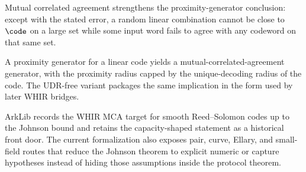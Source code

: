 \begin{definition}\label{def:whir_mca}
    Mutual correlated agreement strengthens the proximity-generator conclusion: except with
    the stated error, a random linear combination cannot be close to $\code$ on a large set
    while some input word fails to agree with any codeword on that same set.
\end{definition}

\begin{lemma}\label{lem:whir_mca_from_proximity}
    A proximity generator for a linear code yields a mutual-correlated-agreement generator,
    with the proximity radius capped by the unique-decoding radius of the code.  The UDR-free
    variant packages the same implication in the form used by later WHIR bridges.
\end{lemma}

\begin{theorem}\label{thm:whir_mca_front_doors}
    ArkLib records the WHIR MCA target for smooth Reed--Solomon codes up to the Johnson bound
    and retains the capacity-shaped statement as a historical front door.  The current
    formalization also exposes pair, curve, Ellary, and small-field routes that reduce the
    Johnson theorem to explicit numeric or capture hypotheses instead of hiding those
    assumptions inside the protocol theorem.
\end{theorem}

